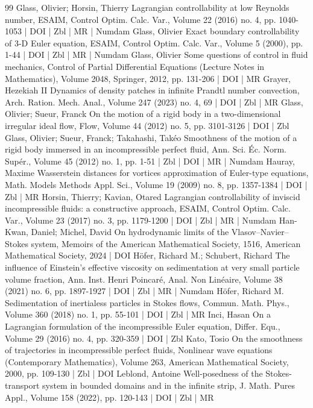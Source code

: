 \documentclass[10pt]{amsart}
\theoremstyle{definition}\newtheorem{defi}[theo]{Definition}\newtheorem{rema}[theo]{Remark}\newtheorem{exam}[theo]{Example}\newtheorem{exem}[theo]{Example}\newtheorem{nota}[theo]{Notation}
\begin{document}
\begin{thebibliography}{99}
 Glass, Olivier; Horsin, Thierry Lagrangian controllability at low Reynolds number, ESAIM, Control Optim. Calc. Var., Volume 22 (2016) no. 4, pp. 1040-1053 | DOI | Zbl | MR | Numdam
 Glass, Olivier Exact boundary controllability of 3-D Euler equation, ESAIM, Control Optim. Calc. Var., Volume 5 (2000), pp. 1-44 | DOI | Zbl | MR | Numdam
 Glass, Olivier Some questions of control in fluid mechanics, Control of Partial Differential Equations (Lecture Notes in Mathematics), Volume 2048, Springer, 2012, pp. 131-206 | DOI | MR
 Grayer, Hezekiah II Dynamics of density patches in infinite Prandtl number convection, Arch. Ration. Mech. Anal., Volume 247 (2023) no. 4, 69 | DOI | Zbl | MR
 Glass, Olivier; Sueur, Franck On the motion of a rigid body in a two-dimensional irregular ideal flow, Flow, Volume 44 (2012) no. 5, pp. 3101-3126 | DOI | Zbl
 Glass, Olivier; Sueur, Franck; Takahashi, Takéo Smoothness of the motion of a rigid body immersed in an incompressible perfect fluid, Ann. Sci. Éc. Norm. Supér., Volume 45 (2012) no. 1, pp. 1-51 | Zbl | DOI | MR | Numdam
 Hauray, Maxime Wasserstein distances for vortices approximation of Euler-type equations, Math. Models Methods Appl. Sci., Volume 19 (2009) no. 8, pp. 1357-1384 | DOI | Zbl | MR
 Horsin, Thierry; Kavian, Otared Lagrangian controllability of inviscid incompressible fluids: a constructive approach, ESAIM, Control Optim. Calc. Var., Volume 23 (2017) no. 3, pp. 1179-1200 | DOI | Zbl | MR | Numdam
 Han-Kwan, Daniel; Michel, David On hydrodynamic limits of the Vlasov–Navier–Stokes system, Memoirs of the American Mathematical Society, 1516, American Mathematical Society, 2024 | DOI
 Höfer, Richard M.; Schubert, Richard The influence of Einstein’s effective viscosity on sedimentation at very small particle volume fraction, Ann. Inst. Henri Poincaré, Anal. Non Linéaire, Volume 38 (2021) no. 6, pp. 1897-1927 | DOI | Zbl | MR | Numdam
 Höfer, Richard M. Sedimentation of inertialess particles in Stokes flows, Commun. Math. Phys., Volume 360 (2018) no. 1, pp. 55-101 | DOI | Zbl | MR
 Inci, Hasan On a Lagrangian formulation of the incompressible Euler equation, Differ. Equ., Volume 29 (2016) no. 4, pp. 320-359 | DOI | Zbl
 Kato, Tosio On the smoothness of trajectories in incompressible perfect fluids, Nonlinear wave equations (Contemporary Mathematics), Volume 263, American Mathematical Society, 2000, pp. 109-130 | Zbl | DOI
 Leblond, Antoine Well-posedness of the Stokes-transport system in bounded domains and in the infinite strip, J. Math. Pures Appl., Volume 158 (2022), pp. 120-143 | DOI | Zbl | MR

\end{thebibliography}
\end{document}
